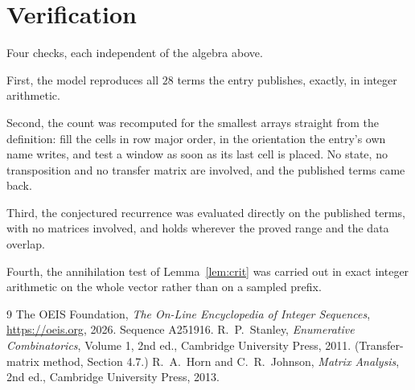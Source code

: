 \documentclass[11pt,a4paper]{article}
\theoremstyle{plain}
\theoremstyle{definition}
\begin{document}
\section{Verification}

Four checks, each independent of the algebra above.

First, the model reproduces all $28$ terms the entry publishes, exactly, in integer
arithmetic.

Second, the count was recomputed for the smallest arrays straight from the definition: fill the
cells in row major order, in the orientation the entry's own name writes, and test a window as
soon as its last cell is placed. No state, no transposition and no transfer matrix are
involved, and the published terms came back.

Third, the conjectured recurrence was evaluated directly on the published terms, with no
matrices involved, and holds wherever the proved range and the data overlap.

Fourth, the annihilation test of Lemma~\ref{lem:crit} was carried out in exact integer
arithmetic on the whole vector rather than on a sampled prefix.

\begin{thebibliography}{9}
 The OEIS Foundation, \emph{The On-Line Encyclopedia of Integer
Sequences}, \url{https://oeis.org}, 2026. Sequence A251916.
 R.~P.~Stanley, \emph{Enumerative Combinatorics}, Volume 1, 2nd ed.,
Cambridge University Press, 2011. (Transfer-matrix method, Section 4.7.)
 R.~A.~Horn and C.~R.~Johnson, \emph{Matrix Analysis}, 2nd ed., Cambridge
University Press, 2013.
\end{thebibliography}
\end{document}
